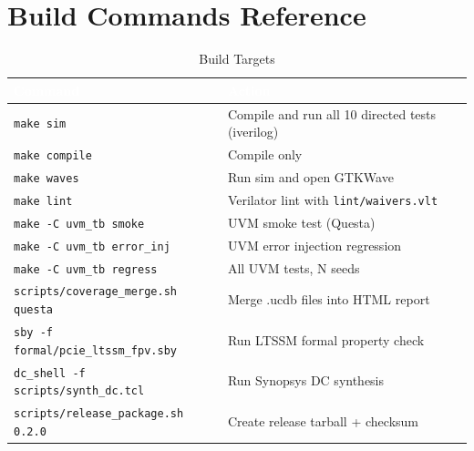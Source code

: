 \documentclass[12pt,a4paper]{report}
\newcommand{\theadcell}[1]{%
  \cellcolor{tablehead}\textcolor{white}{\textbf{#1}}}
\begin{document}
\chapter{Build Commands Reference}

\begin{table}[H]
\centering
\caption{Build Targets}
\begin{tabular}{lp{10cm}}
  \toprule
  \theadcell{Command} & \theadcell{Action} \\
  \midrule
  \texttt{make sim}                         & Compile and run all 10 directed tests (iverilog) \\
  \texttt{make compile}                     & Compile only \\
  \texttt{make waves}                       & Run sim and open GTKWave \\
  \texttt{make lint}                        & Verilator lint with \texttt{lint/waivers.vlt} \\
  \texttt{make -C uvm\_tb smoke}            & UVM smoke test (Questa) \\
  \texttt{make -C uvm\_tb error\_inj}       & UVM error injection regression \\
  \texttt{make -C uvm\_tb regress}          & All UVM tests, N seeds \\
  \texttt{scripts/coverage\_merge.sh questa}& Merge .ucdb files into HTML report \\
  \texttt{sby -f formal/pcie\_ltssm\_fpv.sby}& Run LTSSM formal property check \\
  \texttt{dc\_shell -f scripts/synth\_dc.tcl}& Run Synopsys DC synthesis \\
  \texttt{scripts/release\_package.sh 0.2.0}& Create release tarball + checksum \\
  \bottomrule
\end{tabular}
\end{table}
\end{document}
